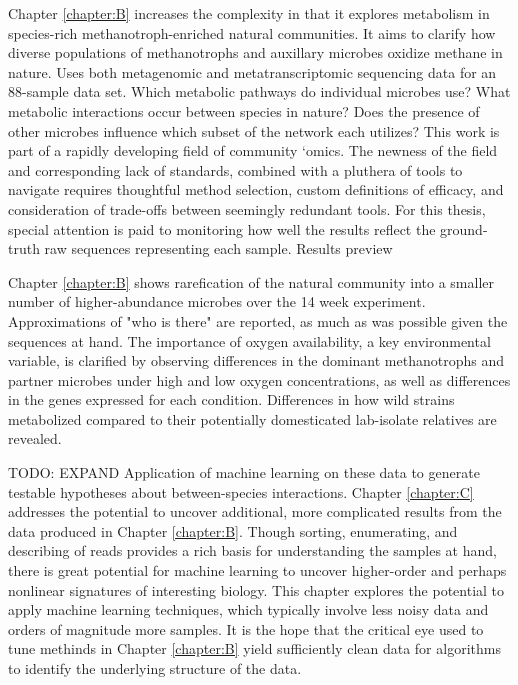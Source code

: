 Chapter \ref{chapter:B} increases the complexity in that it explores metabolism in species-rich methanotroph-enriched natural communities.
It aims to clarify how diverse populations of methanotrophs and auxillary microbes oxidize methane in nature.
Uses both metagenomic and metatranscriptomic sequencing data for an 88-sample data set.
Which metabolic pathways do individual microbes use?
What metabolic interactions occur between species in nature?
Does the presence of other microbes influence which subset of the network each utilizes?
This work is part of a rapidly developing field of community `omics.
The newness of the field and corresponding lack of standards, combined with a pluthera of tools to navigate requires thoughtful method selection, custom definitions of efficacy, and consideration of trade-offs between seemingly redundant tools.
For this thesis, special attention is paid to monitoring how well the results reflect the ground-truth raw sequences representing each sample.
Results preview

Chapter \ref{chapter:B}  shows rarefication of the natural community into a smaller number of higher-abundance microbes over the 14 week experiment.
Approximations of "who is there" are reported, as much as was possible given the sequences at hand.
The importance of oxygen availability, a key environmental variable, is clarified by observing differences in the dominant methanotrophs and partner microbes under high and low oxygen concentrations, as well as differences in the genes expressed for each condition.
Differences in how wild strains metabolized compared to their potentially domesticated lab-isolate relatives are revealed.

TODO: EXPAND Application of machine learning on these data to generate testable hypotheses about between-species interactions.
Chapter \ref{chapter:C} addresses the potential to uncover additional, more complicated results from the data produced in Chapter \ref{chapter:B}.
Though sorting, enumerating, and describing of reads provides a rich basis for understanding the samples at hand, there is great potential for machine learning to uncover higher-order and perhaps nonlinear signatures of interesting biology.
This chapter explores the potential to apply machine learning techniques, which typically involve less noisy data and orders of magnitude more samples.
It is the hope that the critical eye used to tune methinds in Chapter \ref{chapter:B} yield sufficiently clean data for algorithms to identify the underlying structure of the data.




